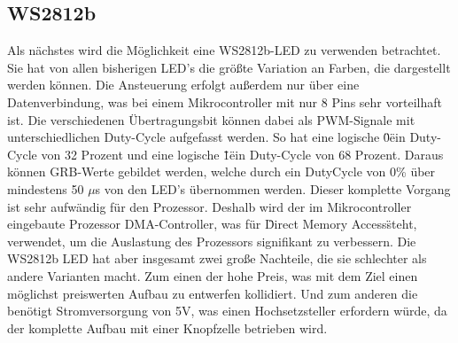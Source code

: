 \documentclass[a4paper,
DIV=13,
12pt,
BCOR=10mm,
department=FakEI,
parskip=half,
automark,
]{article}
\begin{document}
\subsection{WS2812b}
Als nächstes wird die Möglichkeit eine WS2812b-LED zu verwenden betrachtet. Sie hat von allen bisherigen LED's die größte Variation an Farben, die dargestellt werden können. Die Ansteuerung erfolgt außerdem nur über eine Datenverbindung, was bei einem Mikrocontroller mit nur 8 Pins sehr vorteilhaft ist. Die verschiedenen Übertragungsbit können dabei als PWM-Signale mit unterschiedlichen Duty-Cycle aufgefasst werden. So hat eine logische \"0\" ein Duty-Cycle von 32 Prozent und eine logische \"1\" ein Duty-Cycle von 68 Prozent. Daraus können GRB-Werte gebildet werden, welche durch ein Duty\-Cycle von 0\% über mindestens 50 $\mu$s von den LED's übernommen werden. Dieser komplette Vorgang ist sehr aufwändig für den Prozessor. Deshalb wird der im Mikrocontroller eingebaute Prozessor DMA-Controller, was für \"Direct Memory Access\" steht, verwendet, um die Auslastung des Prozessors signifikant zu verbessern. Die WS2812b LED hat aber insgesamt zwei große Nachteile, die sie schlechter als andere Varianten macht. Zum einen der hohe Preis, was mit dem Ziel einen möglichst preiswerten Aufbau zu entwerfen kollidiert. Und zum anderen die benötigt Stromversorgung von 5V, was einen Hochsetzsteller erfordern würde, da der komplette Aufbau mit einer Knopfzelle betrieben wird.

\newpage
\end{document}
